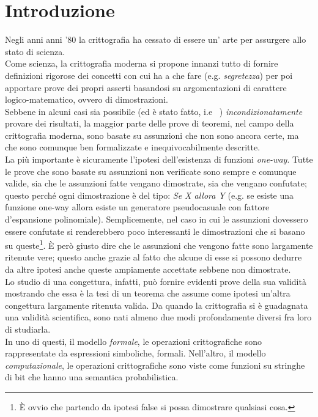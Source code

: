 \documentclass[a4paper,openright,twoside,12pt]{report}
\author{Gian Pietro Farina}
\begin{document}
\chapter*{Introduzione}
Negli anni anni '80 la crittografia ha cessato di essere un' arte per assurgere allo stato di scienza. \\Come scienza, la crittografia moderna
si propone innanzi tutto di fornire definizioni rigorose dei concetti con cui ha a che fare (e.g. \emph{segretezza}) per poi apportare prove dei propri asserti basandosi 
su argomentazioni di carattere logico-matematico, ovvero di dimostrazioni. \\
Sebbene in alcuni casi sia possibile (ed \`e stato fatto, i.e ~\cite{Shannon}) \emph{incondizionatamente} provare dei risultati, la maggior parte delle prove di teoremi, nel campo 
della crittografia moderna, sono basate su assunzioni che non sono ancora certe, ma che sono comunque ben formalizzate e inequivocabilmente descritte.\\La pi\`u importante \`e sicuramente
l'ipotesi dell'esistenza di funzioni \emph{one-way}. Tutte le prove che sono basate su assunzioni non verificate sono sempre e comunque valide, sia che le assunzioni fatte vengano dimostrate,
sia che vengano confutate; questo perch\'e ogni dimostrazione \`e del tipo: \emph{Se X allora Y} (e.g. se esiste una funzione one-way allora esiste un generatore pseudocasuale con fattore
d'espansione polinomiale). Semplicemente, nel caso in cui le assunzioni dovessero essere confutate si renderebbero poco interessanti le dimostrazioni che si basano su queste\footnote{\`E ovvio che partendo da ipotesi false si possa
dimostrare qualsiasi cosa.}.
\`E per\`o giusto dire che le assunzioni che vengono fatte sono largamente ritenute vere; questo anche  grazie al fatto che alcune di esse si possono dedurre da altre ipotesi 
anche queste ampiamente accettate sebbene non dimostrate.\\Lo studio di una congettura, infatti, pu\`o fornire evidenti prove della sua validit\`a mostrando che essa \`e la tesi di un teorema che assume come ipotesi
un'altra congettura largamente ritenuta valida.
Da quando la crittografia si \`e guadagnata una validit\`a scientifica, sono nati almeno due modi profondamente diversi fra loro di
studiarla.\\In uno di questi, il modello \emph{formale}, le operazioni crittografiche sono rappresentate da espressioni simboliche, formali.
Nell'altro, il modello \emph{computazionale}, le operazioni crittografiche sono viste come funzioni su stringhe di bit che hanno una semantica probabilistica.
\end{document}
